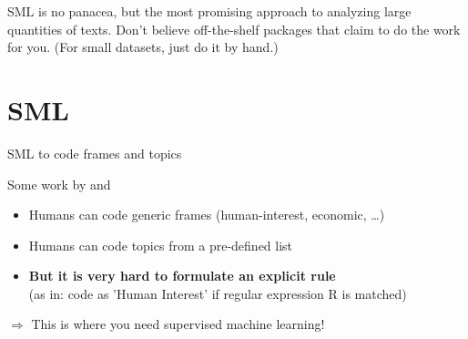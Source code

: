 \documentclass[handout]{beamer}
\begin{document}
\begin{frame}[standout]
SML is no panacea, but the most promising approach to analyzing large quantities of texts. Don't believe off-the-shelf packages that claim to do the work for you.
(For small datasets, just do it by hand.)
\end{frame}




\section{SML}

  




\begin{frame}{SML to code frames and topics}
	\begin{block}{Some work by \cite{Burscher2014} and \cite{Burscher2015} }
		\begin{itemize}
			\item Humans can code generic frames (human-interest, economic, \ldots)
			\item Humans can code topics from a pre-defined list 
			\item<2->\textbf{But it is very hard to formulate an explicit rule} \\(as in: code as 'Human Interest' if regular expression R is matched)
		\end{itemize}
		$\Rightarrow$ This is where you need supervised machine learning!
	\end{block}


\end{frame}
\end{document}
